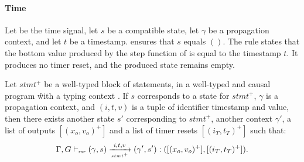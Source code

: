 \begin{skippableproof}
    \paragraph{Time}
    Let \timeop be the time signal, let $s$ be a compatible state, let $\gamma$ be a propagation
    context, and let $t$ be a timestamp.
     ensures that $s$ equals $()$.
    The rule  states that the bottom value produced by
    the step function of \timeop is equal to the timestamp $t$.
    It produces no timer reset, and the produced state remains empty.

    \setcounter{paragraph}{0}
\end{skippableproof}

\begin{lemma}
    \label{lem:semantics:grfrp:theorems:productivity:stmt}
    Let $stmt^+$ be a well-typed block of statements, in a well-typed and causal program \G with a
    typing context \tyCtx.
    If $s$ corresponds to a state for $stmt^+$, $\gamma$ is a propagation context, and $(i, t, v)$
    is a tuple of identifier timestamp and value, then there exists another state $s'$ corresponding
    to $stmt^+$, another context $\gamma'$, a list of outputs $[(x_o, v_o)^+]$ and a list of timer
    resets $[(i_T, t_T)^+]$ such that:
    \begin{equation*}
        \Gamma, G \vdash_{\textnormal{\tiny\textsc{frp}}} (\gamma, s) \xrightarrow[\mbox{\tiny\ensuremath{stmt^+}}]{i, t, v} (\gamma', s'): ([(x_o, v_o)^+], [(i_T, t_T)^+]).
    \end{equation*}
\end{lemma}
